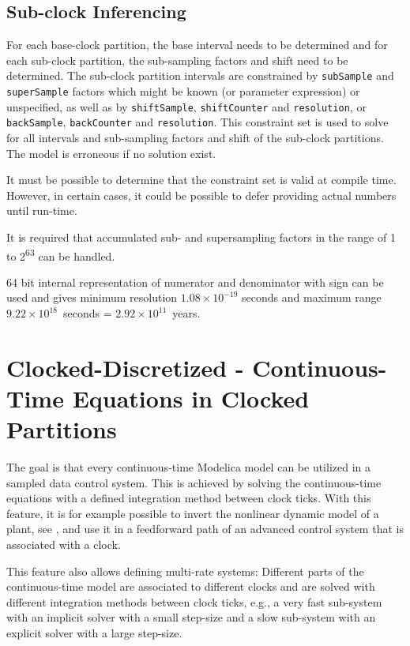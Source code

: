 \subsection{Sub-clock Inferencing}\label{sub-clock-inferencing}

For each base-clock partition, the base interval needs to be determined and for each sub-clock partition, the sub-sampling factors and shift need to be determined.
The sub-clock partition intervals are constrained by \lstinline!subSample! and \lstinline!superSample! factors which might be known (or parameter expression) or unspecified, as well as by \lstinline!shiftSample!, \lstinline!shiftCounter! and \lstinline!resolution!, or \lstinline!backSample!, \lstinline!backCounter! and \lstinline!resolution!.
This constraint set is used to solve for all intervals and sub-sampling factors and shift of the sub-clock partitions.
The model is erroneous if no solution exist.

\begin{nonnormative}
It must be possible to determine that the constraint set is valid at compile time.  However, in certain cases, it could be possible to defer providing actual numbers until run-time.
\end{nonnormative}

It is required that accumulated sub- and supersampling factors in the range of 1 to 2\textsuperscript{63} can be handled.

\begin{nonnormative}
64 bit internal representation of numerator and denominator with sign can be used and gives minimum resolution $1.08\times 10^{-19}$ seconds and maximum range $9.22\times 10^{18}$~seconds = $2.92\times 10^{11}$~years.
\end{nonnormative}

\section{Clocked-Discretized - Continuous-Time Equations in Clocked Partitions}\label{continuous-time-equations-in-clocked-partitions}\label{clocked-discretized-continuous-time-equations-in-clocked-partitions}

\begin{nonnormative}
The goal is that every continuous-time Modelica model can be utilized in a sampled data control system.
This is achieved by solving the continuous-time equations with a defined integration method between clock ticks.
With this feature, it is for example possible to invert the nonlinear dynamic model of a plant, see \textcite{ThummelEtAl2005InverseModels}, and use it in a feedforward path of an advanced control system that is associated with a clock.

This feature also allows defining multi-rate systems: Different parts of the continuous-time model are associated to different clocks and are solved with different integration
methods between clock ticks, e.g., a very fast sub-system with an implicit solver with a small step-size and a slow sub-system with an explicit solver with a large step-size.
\end{nonnormative}

